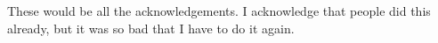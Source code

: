 These would be all the acknowledgements. I acknowledge that people did this already, but it was so bad that I have to do it again.